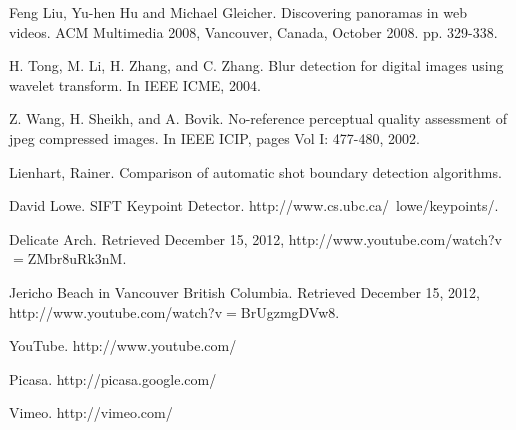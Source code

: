 
\begin{thebibliography}{99}

  
 Feng Liu, Yu-hen Hu and Michael Gleicher. Discovering panoramas in web videos. 
ACM Multimedia 2008, Vancouver, Canada, October 2008. pp. 329-338.  

 H. Tong, M. Li, H. Zhang, and C. Zhang. Blur
detection for digital images using wavelet transform.
In IEEE ICME, 2004.

 Z. Wang, H. Sheikh, and A. Bovik. No-reference
perceptual quality assessment of jpeg compressed
images. In IEEE ICIP, pages Vol I: 477-480, 2002.

 Lienhart, Rainer. Comparison of automatic shot boundary detection algorithms.

 David Lowe. SIFT Keypoint Detector.
http://www.cs.ubc.ca/~lowe/keypoints/.

 Delicate Arch.  Retrieved December 15, 2012,
http://www.youtube.com/watch?v$=$ZMbr8uRk3nM.

 Jericho Beach in Vancouver British Columbia.  Retrieved December 15, 2012,
http://www.youtube.com/watch?v$=$BrUgzmgDVw8.

 YouTube. http://www.youtube.com/

 Picasa. http://picasa.google.com/

 Vimeo. http://vimeo.com/




\end{thebibliography}

